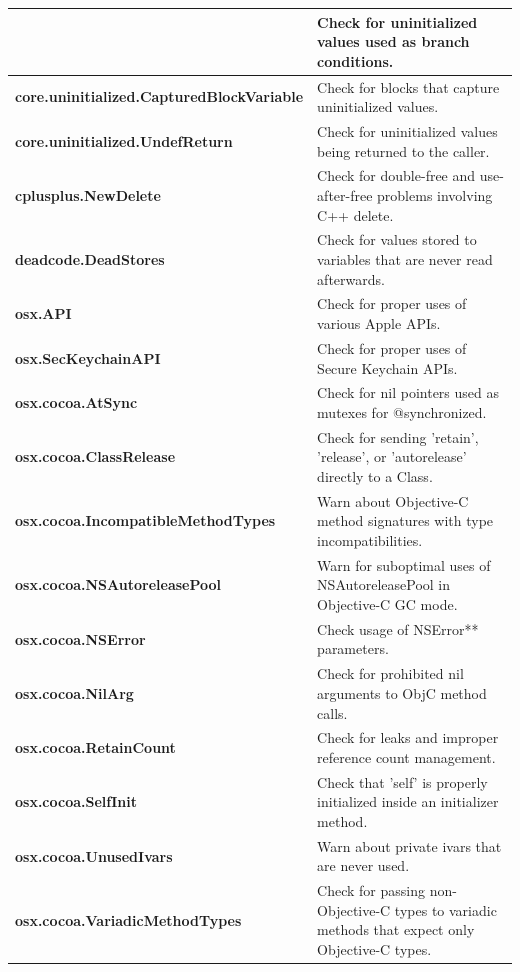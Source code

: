 {\begin{longtable}{||p{}|p{}||}
& Check for uninitialized values used as branch conditions.
    \\
    \hline
    \textbf{core.uninitialized.CapturedBlockVariable}
& Check for blocks that capture uninitialized values.
    \\
    \hline
    \textbf{core.uninitialized.UndefReturn}
& Check for uninitialized values being returned to the caller.
    \\
    \hline
    \textbf{cplusplus.NewDelete}
& Check for double-free and use-after-free problems involving C++ delete.
    \\
    \hline
    \textbf{deadcode.DeadStores}
& Check for values stored to variables that are never read afterwards.
    \\
    \hline
    \textbf{osx.API}
& Check for proper uses of various Apple APIs.
    \\
    \hline
    \textbf{osx.SecKeychainAPI}
& Check for proper uses of Secure Keychain APIs.
    \\
    \hline
    \textbf{osx.cocoa.AtSync}
& Check for nil pointers used as mutexes for @synchronized.
    \\
    \hline
    \textbf{osx.cocoa.ClassRelease}
& Check for sending 'retain', 'release', or 'autorelease' directly to a Class.
    \\
    \hline
    \textbf{osx.cocoa.IncompatibleMethodTypes}
& Warn about Objective-C method signatures with type incompatibilities.
    \\
    \hline
    \textbf{osx.cocoa.NSAutoreleasePool}
& Warn for suboptimal uses of NSAutoreleasePool in Objective-C GC mode.
    \\
    \hline
    \textbf{osx.cocoa.NSError}
& Check usage of NSError** parameters.
    \\
    \hline
    \textbf{osx.cocoa.NilArg}
& Check for prohibited nil arguments to ObjC method calls.
    \\
    \hline
    \textbf{osx.cocoa.RetainCount}
& Check for leaks and improper reference count management.
    \\
    \hline
    \textbf{osx.cocoa.SelfInit}
& Check that 'self' is properly initialized inside an initializer method.
    \\
    \hline
    \textbf{osx.cocoa.UnusedIvars}
& Warn about private ivars that are never used.
    \\
    \hline
    \textbf{osx.cocoa.VariadicMethodTypes}
& Check for passing non-Objective-C types to variadic methods that expect only Objective-C types.
    \\

\end{longtable}}
